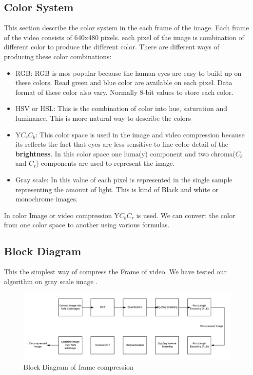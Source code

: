 \documentclass[a4paper]{article}
\begin{document}
\subsection{Color System}
    This section describe the color system in the each frame of the image. Each frame of the video consists of 640x480 pixels. each pixel of the image is combination of different color to produce the different color. There are different ways of producing these color combinations:
    \begin{itemize}
        \item RGB: RGB is mos popular because the human eyes are easy to build up on these colors. Read green and blue color are available on each pixel. Data format of these color also vary. Normally 8-bit values to store each color. 
        \item HSV or HSL: This is the combination of color into hue, saturation and luminance. This is more natural way to describe the colors
        \item Y$C_rC_b$: This color space is used in the image and video compression because its reflects the fact that eyes are less sensitive to fine color detail of the \textbf{brightness}. In this color space one luma(y) component and two chroma($C_b$ and $C_r$) components are used to represent the image.
        \item Gray scale: In this value of each pixel is represented in the single sample representing the amount of light. This is kind of Black and white or monochrome images.
    \end{itemize}
In color Image or video compression Y$C_bC_r$ is used. We can convert the color from one color space to another using various formulas.

\subsection{Block Diagram}
This the simplest way of compress the Frame of video. We have tested our algorithm on gray scale image \cite{online}. 
\begin{figure}[H]
    \centering
    \includegraphics[width = \linewidth]{Blank_Diagram.png}
    \caption{Block Diagram of frame compression}
    \label{fig:my_label}
\end{figure}
\end{document}
